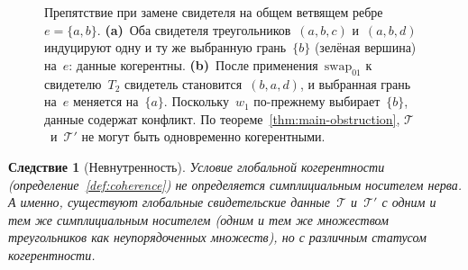 \documentclass[11pt,a4paper]{article}
\theoremstyle{plain}
\newtheorem{corollary}[theorem]{Следствие}
\theoremstyle{definition}
\theoremstyle{remark}
\newcommand{\cT}{\mathcal{T}}
\newcommand{\swapAB}{\mathrm{swap}_{01}}
\begin{document}
\begin{figure}[t]
\caption{Препятствие при замене свидетеля на общем ветвящем ребре
$e = \{a,b\}$. \textbf{(a)}~Оба свидетеля треугольников~$(a,b,c)$
и~$(a,b,d)$ индуцируют одну и ту же выбранную грань~$\{b\}$
(зелёная вершина) на~$e$: данные когерентны. \textbf{(b)}~После
применения~$\swapAB$ к свидетелю~$T_2$ свидетель становится~$(b,a,d)$,
и выбранная грань на~$e$ меняется на~$\{a\}$. Поскольку~$w_1$
по-прежнему выбирает~$\{b\}$, данные содержат конфликт. По
теореме~\ref{thm:main-obstruction}, $\cT$~и~$\cT'$ не могут быть
одновременно когерентными.}
\label{fig:obstruction}
\end{figure}

\begin{corollary}[Невнутренность]
\label{cor:non-intrinsic}
Условие глобальной когерентности (определение~\ref{def:coherence}) не
определяется симплициальным носителем нерва. А именно, существуют
глобальные свидетельские данные~$\cT$ и~$\cT'$ с одним и тем же
симплициальным носителем (одним и тем же множеством треугольников как
неупорядоченных множеств), но с различным статусом когерентности.
\end{corollary}
\end{document}
